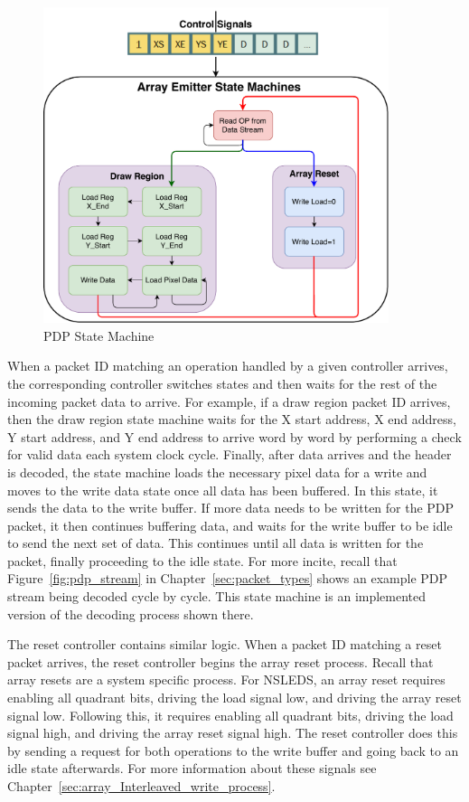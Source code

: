     \begin{figure}[t]
        \centering
        \includegraphics[width=0.90\textwidth]{fig/pdp_state_machine.pdf}
        \caption{PDP State Machine}
        \label{fig:state_machine}
    \end{figure}


    When a packet ID matching an operation handled by a given controller arrives, the corresponding controller switches states and then waits for the rest of the incoming packet data to arrive. For example, if a draw region packet ID arrives, then the draw region state machine waits for the X start address, X end address, Y start address, and Y end address to arrive word by word by performing a check for valid data each system clock cycle. Finally, after data arrives and the header is decoded, the state machine loads the necessary pixel data for a write and moves to the write data state once all data has been buffered. In this state, it sends the data to the write buffer. If more data needs to be written for the PDP packet, it then continues buffering data, and waits for the write buffer to be idle to send the next set of data. This continues until all data is written for the packet, finally proceeding to the idle state. For more incite, recall that Figure~\ref{fig:pdp_stream} in Chapter~\ref{sec:packet_types} shows an example PDP stream being decoded cycle by cycle. This state machine is an implemented version of the decoding process shown there.

    The reset controller contains similar logic. When a packet ID matching a reset packet arrives, the reset controller begins the array reset process. Recall that array resets are a system specific process. For NSLEDS, an array reset requires enabling all quadrant bits, driving the load signal low, and driving the array reset signal low. Following this, it requires enabling all quadrant bits, driving the load signal high, and driving the array reset signal high. The reset controller does this by sending a request for both operations to the write buffer and going back to an idle state afterwards. For more information about these signals see Chapter~\ref{sec:array_Interleaved_write_process}.

